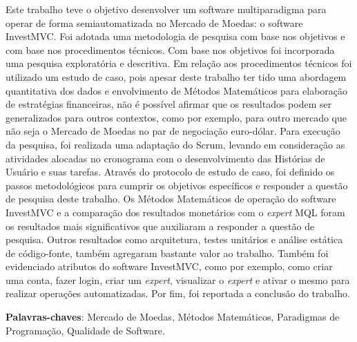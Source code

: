\begin{resumo}
Este trabalho teve o objetivo desenvolver um software multiparadigma para operar de forma semiautomatizada no Mercado de Moedas: o software InvestMVC. Foi adotada uma metodologia de pesquisa com base nos objetivos e com base nos procedimentos técnicos. Com base nos objetivos foi incorporada uma pesquisa exploratória e descritiva. Em relação aos procedimentos técnicos foi utilizado um estudo de caso, pois apesar deste trabalho ter tido uma abordagem quantitativa dos dados e envolvimento de Métodos Matemáticos para elaboração de estratégias financeiras, não é possível afirmar que os resultados podem ser generalizados para outros contextos, como por exemplo, para outro mercado que não seja o Mercado de Moedas no par de negociação euro-dólar. Para execução da pesquisa, foi realizada uma adaptação do Scrum, levando em consideração as atividades alocadas no cronograma com o desenvolvimento das Histórias de Usuário e suas tarefas. Através do protocolo de estudo de caso, foi definido os passos metodológicos para cumprir os objetivos específicos e responder a questão de pesquisa deste trabalho. Os Métodos Matemáticos de operação do software InvestMVC e a comparação dos resultados monetários com o \textit{expert} MQL foram os resultados mais significativos que auxiliaram a responder a questão de pesquisa. Outros resultados como arquitetura, testes unitários e análise estática de código-fonte, também agregaram bastante valor ao trabalho. Também foi evidenciado atributos do software InvestMVC, como por exemplo, como criar uma conta, fazer login, criar um \textit{expert}, visualizar o \textit{expert} e ativar o mesmo para realizar operações automatizadas. Por fim, foi reportada a conclusão do trabalho.

\vspace{\onelineskip}
    
 \noindent
 \textbf{Palavras-chaves}: Mercado de Moedas, Métodos Matemáticos, Paradigmas de Programação, Qualidade de Software.
\end{resumo}
